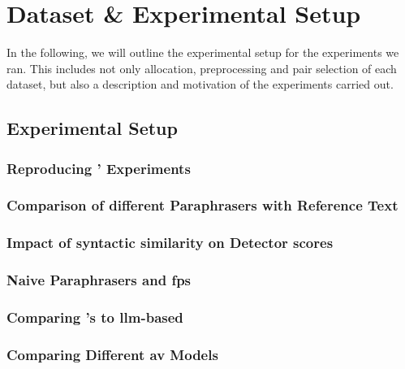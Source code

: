 \chapter{Dataset \& Experimental Setup}
\label{chap:dataset_experimental_setup}

In the following, we will outline the experimental setup for the experiments we ran.
This includes not only allocation, preprocessing and pair selection of each dataset, but also a description and motivation of the experiments carried out.




\section{Experimental Setup}
\label{sec:experimental_setup}

\subsection{Reproducing \citet{koppel_determining_2014}' Experiments}



\subsection{Comparison of different Paraphrasers with Reference Text}

\subsection{Impact of syntactic similarity on \imp{} Detector scores}
\label{sec:syn_sim_impact_}

\subsection{Naive Paraphrasers and \acp{fp}}

\subsection{Comparing \citet{koppel_determining_2014}'s to \ac{llm}-based \imps{}}

\subsection{Comparing Different \ac{av} Models}





